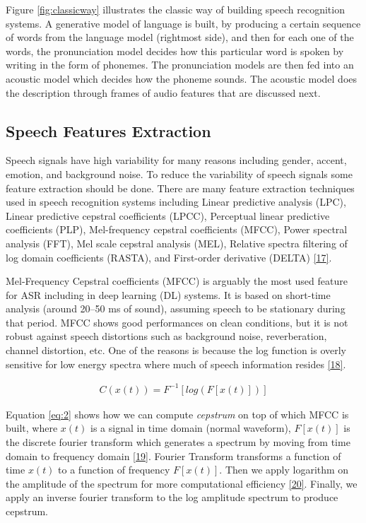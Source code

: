 \documentclass[
  a4paper,
]{article}
\begin{document}
Figure \ref{fig:classicway} illustrates the classic way of building
speech recognition systems. A generative model of language is built, by
producing a certain sequence of words from the language model (rightmost
side), and then for each one of the words, the pronunciation model
decides how this particular word is spoken by writing in the form of
phonemes. The pronunciation models are then fed into an acoustic model
which decides how the phoneme sounds. The acoustic model does the
description through frames of audio features that are discussed next.

\hypertarget{speech-features-extraction}{%
\subsection{Speech Features
Extraction}\label{speech-features-extraction}}

Speech signals have high variability for many reasons including gender,
accent, emotion, and background noise. To reduce the variability of
speech signals some feature extraction should be done. There are many
feature extraction techniques used in speech recognition systems
including Linear predictive analysis (LPC), Linear predictive cepstral
coefficients (LPCC), Perceptual linear predictive coefficients (PLP),
Mel-frequency cepstral coefficients (MFCC), Power spectral analysis
(FFT), Mel scale cepstral analysis (MEL), Relative spectra filtering of
log domain coefficients (RASTA), and First-order derivative (DELTA)
\protect\hyperlink{ref-shrawankar2013techniques}{{[}17{]}}.

Mel-Frequency Cepstral coefficients (MFCC) is arguably the most used
feature for ASR including in deep learning (DL) systems. It is based on
short-time analysis (around 20--50 ms of sound), assuming speech to be
stationary during that period. MFCC shows good performances on clean
conditions, but it is not robust against speech distortions such as
background noise, reverberation, channel distortion, etc. One of the
reasons is because the log function is overly sensitive for low energy
spectra where much of speech information resides
\protect\hyperlink{ref-8949593}{{[}18{]}}.

\begin{align}
\label{eq:2}
C(x(t)) = F^{-1}[log(F[x(t)])]
\end{align}

Equation \ref{eq:2} shows how we can compute \emph{cepstrum} on top of
which MFCC is built, where \(x(t)\) is a signal in time domain (normal
waveform), \(F[x(t)]\) is the discrete fourier transform which generates
a spectrum by moving from time domain to frequency domain
\protect\hyperlink{ref-4320436}{{[}19{]}}. Fourier Transform transforms
a function of time \(x(t)\) to a function of frequency \(F[x(t)]\). Then
we apply logarithm on the amplitude of the spectrum for more
computational efficiency \protect\hyperlink{ref-logft}{{[}20{]}}.
Finally, we apply an inverse fourier transform to the log amplitude
spectrum to produce cepstrum.
\end{document}
